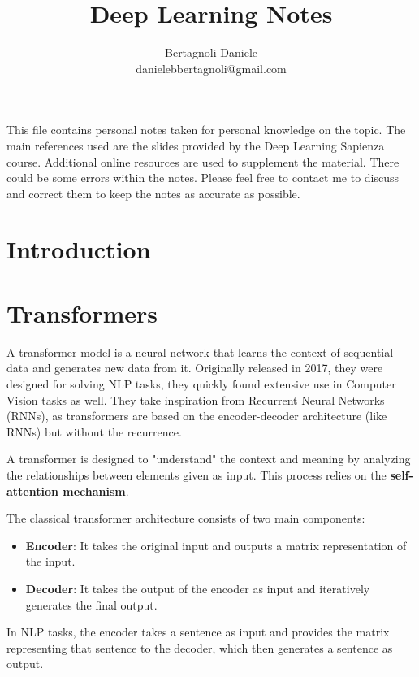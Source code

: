 \documentclass[12pt]{article}
\title{Deep Learning Notes}
\author{Bertagnoli Daniele \\ danielebbertagnoli@gmail.com}
\date{}
\begin{document}
\maketitle

This file contains personal notes taken for personal knowledge on the topic. The main references used are 
the slides provided by the Deep Learning Sapienza course. Additional online resources are used to supplement 
the material. There could be some errors within the notes. Please feel free to contact me to discuss and 
correct them to keep the notes as accurate as possible.

\newpage

\tableofcontents

\newpage

\section{Introduction}
 

\section{Transformers}
\label{sec:transformer}
A transformer model is a neural network that learns the context of sequential data and generates new data 
from it. Originally released in 2017, they were designed for solving NLP tasks, they quickly found extensive use in Computer Vision tasks as well.
They take inspiration from Recurrent Neural Networks (RNNs), as transformers are based on the encoder-decoder 
architecture (like RNNs) but without the recurrence.

A transformer is designed to "understand" the context and meaning by analyzing the relationships between 
elements given as input. This process relies on the \textbf{self-attention mechanism}.

The classical transformer architecture consists of two main components:
\begin{itemize}
    \item \textbf{Encoder}: It takes the original input and outputs a matrix representation of the input.
    \item \textbf{Decoder}: It takes the output of the encoder as input and iteratively generates the final output. 
\end{itemize}
In NLP tasks, the encoder takes a sentence as input and provides the matrix representing that sentence to 
the decoder, which then generates a sentence as output.
\end{document}
